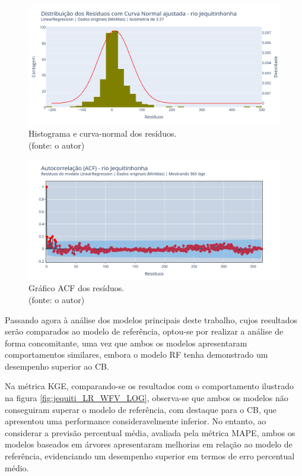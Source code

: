\begin{figure}[!h]
	\centering
	\includegraphics[scale=0.33]{Figuras/jequiti/wfv/LR/LR_WFV_ORIG_RESID_x_CURVA_NORMAL.png}
	\caption{Histograma e curva-normal dos resíduos.\\(fonte: o autor)}
	\label{fig:jequiti_LR_WFV_ORIG_RESID_x_CURVA_NORMAL}
\end{figure}

\begin{figure}[!h]
	\centering
	\includegraphics[scale=0.33]{Figuras/jequiti/wfv/LR/LR_WFV_ORIG_RESID_ACF.png}
	\caption{Gráfico ACF dos resíduos.\\(fonte: o autor)}
	\label{fig:jequiti_LR_WFV_ORIG_RESID_ACF}
\end{figure}
\clearpage

Passando agora à análise dos modelos principais deste trabalho, cujos resultados serão comparados ao modelo de referência, optou-se por realizar a análise de forma concomitante, uma vez que ambos os modelos apresentaram comportamentos similares, embora o modelo RF tenha demonstrado um desempenho superior ao CB.

Na métrica KGE, comparando-se os resultados com o comportamento ilustrado na figura \ref{fig:jequiti_LR_WFV_LOG}, observa-se que ambos os modelos não conseguiram superar o modelo de referência, com destaque para o CB, que apresentou uma performance consideravelmente inferior. No entanto, ao considerar a previsão percentual média, avaliada pela métrica MAPE, ambos os modelos baseados em árvores apresentaram melhorias em relação ao modelo de referência, evidenciando um desempenho superior em termos de erro percentual médio.

